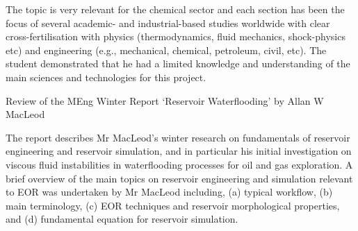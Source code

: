 \documentclass[14pt,twoside]{report}
\begin{document}
The topic is very relevant for the chemical sector and each section has been the focus of several academic- and industrial-based studies worldwide with clear cross-fertilisation with physics (thermodynamics, fluid mechanics, shock-physics etc) and engineering (e.g., mechanical, chemical, petroleum, civil, etc). The student demonstrated that he had a limited knowledge and understanding of the main sciences and technologies for this project.






\vfill

\clearpage




\bigskip

\begin{center}
  {\Large Review of the MEng Winter Report `Reservoir Waterflooding' by Allan W MacLeod}
\end{center}

The report describes Mr MacLeod's winter research on fundamentals of reservoir engineering and reservoir simulation, and in particular his initial investigation on viscous fluid instabilities in waterflooding processes for oil and gas exploration. A brief overview of the main topics on reservoir engineering and simulation relevant to EOR was undertaken by Mr MacLeod including, (a) typical workflow, (b) main terminology, (c) EOR techniques and reservoir morphological properties, and (d) fundamental equation for reservoir simulation.  
\end{document}
